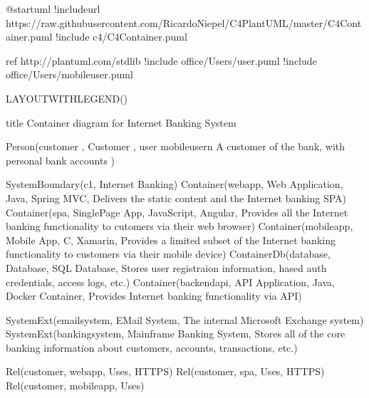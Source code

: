 \documentclass[letterpaper,10pt,english]{sphinxmanual}
\begin{document}
\begin{sphinxVerbatim}[commandchars=\\\{\},numbers=left,firstnumber=1,stepnumber=1]
@startuml
\PYGZsq{}!includeurl https://raw.githubusercontent.com/RicardoNiepel/C4\PYGZhy{}PlantUML/master/C4\PYGZus{}Container.puml
!include \PYGZlt{}c4/C4\PYGZus{}Container.puml\PYGZgt{}  

\PYGZsq{}ref http://plantuml.com/stdlib
!include \PYGZlt{}office/Users/user.puml\PYGZgt{}
!include \PYGZlt{}office/Users/mobile\PYGZus{}user.puml\PYGZgt{}

LAYOUT\PYGZus{}WITH\PYGZus{}LEGEND()


title Container diagram for Internet Banking System

Person(customer  , Customer , \PYGZdq{}\PYGZlt{}\PYGZdl{}user\PYGZgt{} \PYGZlt{}\PYGZdl{}mobile\PYGZus{}user\PYGZgt{}\PYGZbs{}n A customer of the bank, with personal bank accounts\PYGZdq{} )

System\PYGZus{}Boundary(c1, \PYGZdq{}Internet Banking\PYGZdq{}) \PYGZob{}
    Container(web\PYGZus{}app, \PYGZdq{}Web Application\PYGZdq{}, \PYGZdq{}Java, Spring MVC\PYGZdq{}, \PYGZdq{}Delivers the static content and the Internet banking SPA\PYGZdq{})
    Container(spa, \PYGZdq{}Single\PYGZhy{}Page App\PYGZdq{}, \PYGZdq{}JavaScript, Angular\PYGZdq{}, \PYGZdq{}Provides all the Internet banking functionality to cutomers via their web browser\PYGZdq{})
    Container(mobile\PYGZus{}app, \PYGZdq{}Mobile App\PYGZdq{}, \PYGZdq{}C\PYGZsh{}, Xamarin\PYGZdq{}, \PYGZdq{}Provides a limited subset of the Internet banking functionality to customers via their mobile device\PYGZdq{})
    ContainerDb(database, \PYGZdq{}Database\PYGZdq{}, \PYGZdq{}SQL Database\PYGZdq{}, \PYGZdq{}Stores user registraion information, hased auth credentials, access logs, etc.\PYGZdq{})
    Container(backend\PYGZus{}api, \PYGZdq{}API Application\PYGZdq{}, \PYGZdq{}Java, Docker Container\PYGZdq{}, \PYGZdq{}Provides Internet banking functionality via API\PYGZdq{})
\PYGZcb{}

System\PYGZus{}Ext(email\PYGZus{}system, \PYGZdq{}E\PYGZhy{}Mail System\PYGZdq{}, \PYGZdq{}The internal Microsoft Exchange system\PYGZdq{})
System\PYGZus{}Ext(banking\PYGZus{}system, \PYGZdq{}Mainframe Banking System\PYGZdq{}, \PYGZdq{}Stores all of the core banking information about customers, accounts, transactions, etc.\PYGZdq{})

Rel(customer, web\PYGZus{}app, \PYGZdq{}Uses\PYGZdq{}, \PYGZdq{}HTTPS\PYGZdq{})
Rel(customer, spa, \PYGZdq{}Uses\PYGZdq{}, \PYGZdq{}HTTPS\PYGZdq{})
Rel(customer, mobile\PYGZus{}app, \PYGZdq{}Uses\PYGZdq{})


\end{sphinxVerbatim}
\end{document}
